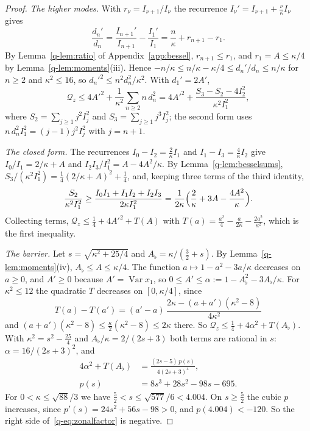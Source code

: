 \documentclass[11pt]{amsart}
\theoremstyle{definition}
\theoremstyle{remark}
\numberwithin{equation}{section}
\newcommand{\Var}{\operatorname{Var}}
\begin{document}
\begin{proof}
\emph{The higher modes.} With $r_\nu=I_{\nu+1}/I_\nu$ the recurrence
$I_\nu'=I_{\nu+1}+\frac\nu\kappa I_\nu$ gives
\[
\frac{d_n'}{d_n}=\frac{I_{n+1}'}{I_{n+1}}-\frac{I_1'}{I_1}=\frac n\kappa+
r_{n+1}-r_1 .
\]
By Lemma~\ref{q-lem:ratio} of Appendix~\ref{app:bessel}, $r_{n+1}\le r_1$, and
$r_1=A\le\kappa/4$ by Lemma~\ref{q-lem:moments}(iii). Hence $-n/\kappa\le
n/\kappa-\kappa/4\le d_n'/d_n\le n/\kappa$ for $n\ge2$ and $\kappa^2\le16$, so
$d_n'^2\le n^2d_n^2/\kappa^2$. With $d_1'=2A'$,
\[
\mathcal Q_z\le4A'^2+\frac1{\kappa^2}\sum_{n\ge2}n\,d_n^2=4A'^2+\frac{S_3-
S_2-4I_2^2}{\kappa^2I_1^2},
\]
where $S_2=\sum_{j\ge1}j^2I_j^2$ and $S_3=\sum_{j\ge1}j^3I_j^2$; the
second form uses $n\,d_n^2I_1^2=(j-1)j^2I_j^2$ with $j=n+1$.

\emph{The closed form.} The recurrences $I_0-I_2=\frac2\kappa I_1$ and
$I_1-I_3=\frac4\kappa I_2$ give $I_0/I_1=2/\kappa+A$ and $I_2I_3/I_1^2=A-
4A^2/\kappa$. By Lemma~\ref{q-lem:besselsums},
$S_3/(\kappa^2I_1^2)=\frac14(2/\kappa+A)^2+\frac14$, and, keeping three
terms of the third identity,
\[
\frac{S_2}{\kappa^2I_1^2}\ge\frac{I_0I_1+I_1I_2+I_2I_3}{2\kappa I_1^2}=
\frac1{2\kappa}\Bigl(\frac2\kappa+3A-\frac{4A^2}\kappa\Bigr).
\]
Collecting terms, $\mathcal Q_z\le\frac14+4A'^2+T(A)$ with $T(a)=\frac{a^2}4-
\frac a{2\kappa}-\frac{2a^2}{\kappa^2}$, which is the first inequality.

\emph{The barrier.} Let $s=\sqrt{\kappa^2+25/4}$ and $A_\flat=\kappa/(\frac32
+s)$. By Lemma~\ref{q-lem:moments}(iv), $A_\flat\le A\le\kappa/4$. The function
$a\mapsto1-a^2-3a/\kappa$ decreases on $a\ge0$, and $A'\ge0$ because $A'=
\Var x_1$, so $0\le A'\le\alpha:=1-A_\flat^2-3A_\flat/\kappa$. For $\kappa^2\le
12$ the quadratic $T$ decreases on $[0,\kappa/4]$, since
\[
T(a)-T(a')=(a'-a)\,\frac{2\kappa-(a+a')(\kappa^2-8)}{4\kappa^2}
\]
and $(a+a')(\kappa^2-8)\le\frac\kappa2(\kappa^2-8)\le2\kappa$ there. So
$\mathcal Q_z\le\frac14+4\alpha^2+T(A_\flat)$. With $\kappa^2=s^2-\frac{25}4$
and $A_\flat/\kappa=2/(2s+3)$ both terms are rational in $s$:
$\alpha=16/(2s+3)^2$, and
\begin{equation}\label{q-eq:zonalfactor}
\begin{aligned}
4\alpha^2+T(A_\flat)&=\frac{(2s-5)\,p(s)}{4(2s+3)^4},\\
p(s)&=8s^3+28s^2-98s-695 .
\end{aligned}
\end{equation}
For $0<\kappa\le\sqrt{88}/3$ we have $\frac52<s\le\sqrt{577}/6<4.004$. On
$s\ge\frac52$ the cubic $p$ increases, since $p'(s)=24s^2+56s-98>0$, and
$p(4.004)<-120$. So the right side of~\eqref{q-eq:zonalfactor} is negative.
\end{proof}
\end{document}
